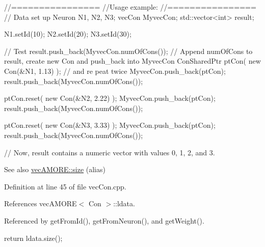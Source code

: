 \begin{DoxyCode}
  //================
  //Usage example:
  //================
                        // Data set up
                        Neuron N1, N2, N3;
                        vecCon MyvecCon;
                        std::vector<int> result;

                        N1.setId(10);
                        N2.setId(20);
                        N3.setId(30);

                        // Test
                        result.push_back(MyvecCon.numOfCons());         // Append
       numOfCons to result, create new Con and push_back into MyvecCon
                        ConSharedPtr ptCon( new Con(&N1, 1.13) );       // and re
      peat twice
                        MyvecCon.push_back(ptCon);
                        result.push_back(MyvecCon.numOfCons());

                        ptCon.reset(  new Con(&N2, 2.22) );
                        MyvecCon.push_back(ptCon);
                        result.push_back(MyvecCon.numOfCons());

                        ptCon.reset(  new Con(&N3, 3.33) );
                        MyvecCon.push_back(ptCon);
                        result.push_back(MyvecCon.numOfCons());

        // Now, result contains a numeric vector with values 0, 1, 2, and 3.
\end{DoxyCode}


\begin{DoxySeeAlso}{See also}
\hyperlink{classvec_a_m_o_r_e_ae1289a7870dbdd19b6455a890e94ce48}{vecAMORE::size} (alias) 
\end{DoxySeeAlso}


Definition at line 45 of file vecCon.cpp.



References vecAMORE$<$ Con $>$::ldata.



Referenced by getFromId(), getFromNeuron(), and getWeight().


\begin{DoxyCode}
                       {
        return ldata.size();
}
\end{DoxyCode}


